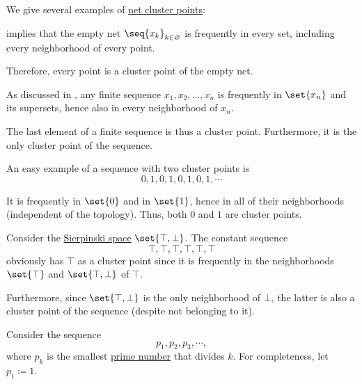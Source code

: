 \begin{example}\label{ex:def:net_cluster_point}
  We give several examples of \hyperref[def:net_cluster_point]{net cluster points}:

  \begin{thmenum}
      implies that the empty net \( \seq{ x_k }_{k \in \varnothing} \) is frequently in every set, including every neighborhood of every point.

    Therefore, every point is a cluster point of the empty net.

     As discussed in , any finite sequence \( x_1, x_2, \ldots, x_n \) is frequently in \( \set{ x_n } \) and its supersets, hence also in every neighborhood of \( x_n \).

    The last element of a finite sequence is thus a cluster point. Furthermore, it is the only cluster point of the sequence.

     An easy example of a sequence with two cluster points is
    \begin{equation*}
      0, 1, 0, 1, 0, 1, 0, 1, \cdots
    \end{equation*}

    It is frequently in \( \set{ 0 } \) and in \( \set{ 1 } \), hence in all of their neighborhoods (independent of the topology). Thus, both \( 0 \) and \( 1 \) are cluster points.

     Consider the \hyperref[def:sierpinski_space]{Sierpinski space} \( \set{ \top, \bot } \). The constant sequence
    \begin{equation*}
      \top, \top, \top, \top, \top, \top
    \end{equation*}
    obviously has \( \top \) as a cluster point since it is frequently in the neighborhoods \( \set{ \top } \) and \( \set{ \top, \bot } \) of \( \top \).

    Furthermore, since \( \set{ \top, \bot } \) is the only neighborhood of \( \bot \), the latter is also a cluster point of the sequence (despite not belonging to it).

     Consider the sequence
    \begin{equation*}
      p_1, p_2, p_3, \cdots,
    \end{equation*}
    where \( p_k \) is the smallest \hyperref[def:prime_number]{prime number} that divides \( k \). For completeness, let \( p_1 \coloneqq 1 \).


\end{thmenum}
\end{example}
